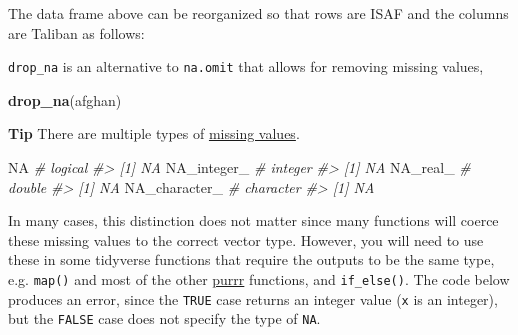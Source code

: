 \documentclass[]{book}
\newenvironment{Shaded}{\begin{snugshade}}{\end{snugshade}}
\newcommand{\KeywordTok}[1]{\textcolor[rgb]{0.13,0.29,0.53}{\textbf{#1}}}
\newcommand{\StringTok}[1]{\textcolor[rgb]{0.31,0.60,0.02}{#1}}
\newcommand{\CommentTok}[1]{\textcolor[rgb]{0.56,0.35,0.01}{\textit{#1}}}
\newcommand{\OtherTok}[1]{\textcolor[rgb]{0.56,0.35,0.01}{#1}}
\newcommand{\OperatorTok}[1]{\textcolor[rgb]{0.81,0.36,0.00}{\textbf{#1}}}
\newcommand{\NormalTok}[1]{#1}
\theoremstyle{definition}
\theoremstyle{definition}
\theoremstyle{definition}
\theoremstyle{remark}
\begin{document}
The data frame above can be reorganized so that rows are ISAF and the
columns are Taliban as follows:

\begin{Shaded}
\end{Shaded}

\texttt{drop\_na} is an alternative to \texttt{na.omit} that allows for
removing missing values,

\begin{Shaded}
\begin{Highlighting}[]
\KeywordTok{drop_na}\NormalTok{(afghan)}
\end{Highlighting}
\end{Shaded}

\textbf{Tip} There are multiple types of
\href{http://r4ds.had.co.nz/vectors.html\#important-types-of-atomic-vector}{missing
values}.

\begin{Shaded}
\begin{Highlighting}[]
\OtherTok{NA}  \CommentTok{# logical}
\CommentTok{#> [1] NA}
\OtherTok{NA_integer_} \CommentTok{# integer}
\CommentTok{#> [1] NA}
\OtherTok{NA_real_} \CommentTok{# double}
\CommentTok{#> [1] NA}
\OtherTok{NA_character_} \CommentTok{# character}
\CommentTok{#> [1] NA}
\end{Highlighting}
\end{Shaded}

In many cases, this distinction does not matter since many functions
will coerce these missing values to the correct vector type. However,
you will need to use these in some tidyverse functions that require the
outputs to be the same type, e.g. \texttt{map()} and most of the other
\href{https://cran.r-project.org/package=purrr}{purrr} functions, and
\texttt{if\_else()}. The code below produces an error, since the
\texttt{TRUE} case returns an integer value (\texttt{x} is an integer),
but the \texttt{FALSE} case does not specify the type of \texttt{NA}.
\end{document}

